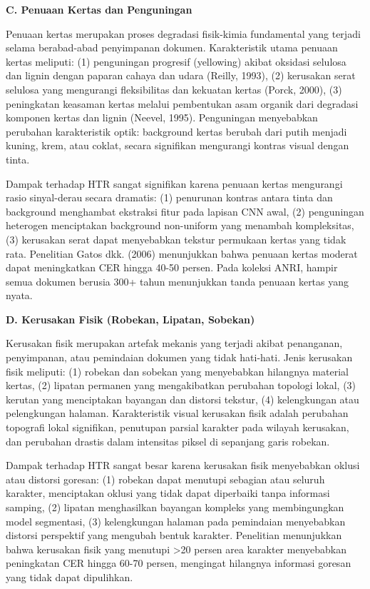 \documentclass[12pt,a4paper]{book}
\begin{document}
\vspace{0.5ex}
\noindent\textbf{C. Penuaan Kertas dan Penguningan}

Penuaan kertas merupakan proses degradasi fisik-kimia fundamental yang terjadi selama berabad-abad penyimpanan dokumen. Karakteristik utama penuaan kertas meliputi: (1) penguningan progresif (yellowing) akibat oksidasi selulosa dan lignin dengan paparan cahaya dan udara (Reilly, 1993), (2) kerusakan serat selulosa yang mengurangi fleksibilitas dan kekuatan kertas (Porck, 2000), (3) peningkatan keasaman kertas melalui pembentukan asam organik dari degradasi komponen kertas dan lignin (Neevel, 1995). Penguningan menyebabkan perubahan karakteristik optik: background kertas berubah dari putih menjadi kuning, krem, atau coklat, secara signifikan mengurangi kontras visual dengan tinta.

Dampak terhadap HTR sangat signifikan karena penuaan kertas mengurangi rasio sinyal-derau secara dramatis: (1) penurunan kontras antara tinta dan background menghambat ekstraksi fitur pada lapisan CNN awal, (2) penguningan heterogen menciptakan background non-uniform yang menambah kompleksitas, (3) kerusakan serat dapat menyebabkan tekstur permukaan kertas yang tidak rata. Penelitian Gatos dkk. (2006) menunjukkan bahwa penuaan kertas moderat dapat meningkatkan CER hingga 40-50 persen. Pada koleksi ANRI, hampir semua dokumen berusia 300+ tahun menunjukkan tanda penuaan kertas yang nyata.

\vspace{0.5ex}
\noindent\textbf{D. Kerusakan Fisik (Robekan, Lipatan, Sobekan)}

Kerusakan fisik merupakan artefak mekanis yang terjadi akibat penanganan, penyimpanan, atau pemindaian dokumen yang tidak hati-hati. Jenis kerusakan fisik meliputi: (1) robekan dan sobekan yang menyebabkan hilangnya material kertas, (2) lipatan permanen yang mengakibatkan perubahan topologi lokal, (3) kerutan yang menciptakan bayangan dan distorsi tekstur, (4) kelengkungan atau pelengkungan halaman. Karakteristik visual kerusakan fisik adalah perubahan topografi lokal signifikan, penutupan parsial karakter pada wilayah kerusakan, dan perubahan drastis dalam intensitas piksel di sepanjang garis robekan.

Dampak terhadap HTR sangat besar karena kerusakan fisik menyebabkan oklusi atau distorsi goresan: (1) robekan dapat menutupi sebagian atau seluruh karakter, menciptakan oklusi yang tidak dapat diperbaiki tanpa informasi samping, (2) lipatan menghasilkan bayangan kompleks yang membingungkan model segmentasi, (3) kelengkungan halaman pada pemindaian menyebabkan distorsi perspektif yang mengubah bentuk karakter. Penelitian menunjukkan bahwa kerusakan fisik yang menutupi >20 persen area karakter menyebabkan peningkatan CER hingga 60-70 persen, mengingat hilangnya informasi goresan yang tidak dapat dipulihkan.
\end{document}
